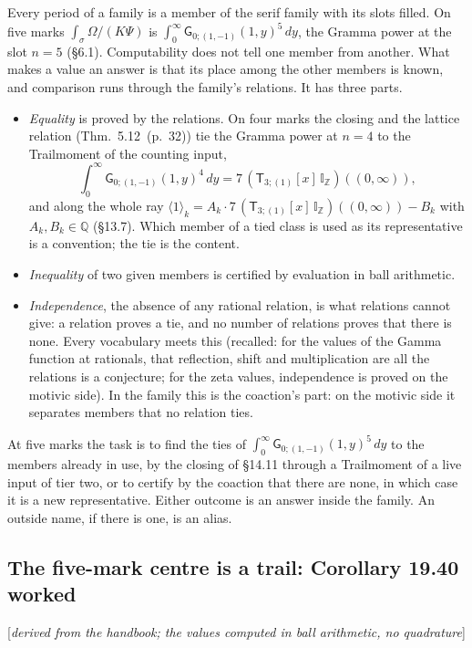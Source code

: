 \documentclass[11pt]{article}
\newcommand{\sG}{\mathsf G}
\newcommand{\sT}{\mathsf T}
\newcommand{\IZ}{\mathbb I_{\mathbb Z}}
\newcommand{\Tx}[3]{(\sT_{#1;(1)}[x]\,#2)((#3,\infty))}
\newcommand{\status}[1]{\hfill{\small[\textit{#1}]}}
\newcommand{\hb}[2]{#1~(p.~#2)}   %
\theoremstyle{plain}
\theoremstyle{remark}
\begin{document}
Every period of a family is a member of the serif family with its slots filled. On five marks $\int_\sigma\Omega/(K\Psi)$ is $\int_0^\infty\sG_{0;(1,-1)}(1,y)^5\,dy$, the Gramma power at the slot $n=5$ (\S6.1). Computability does not tell one member from another. What makes a value an answer is that its place among the other members is known, and comparison runs through the family's relations. It has three parts.
\begin{itemize}
\item \emph{Equality} is proved by the relations. On four marks the closing and the lattice relation (Thm.~\hb{5.12}{32}) tie the Gramma power at $n=4$ to the Trailmoment of the counting input,
\[
\int_0^\infty\sG_{0;(1,-1)}(1,y)^4\,dy=7\,\Tx3\IZ0,
\]
and along the whole ray $\langle1\rangle_k=A_k\cdot7\,\Tx3\IZ0-B_k$ with $A_k,B_k\in\mathbb Q$ (\S13.7). Which member of a tied class is used as its representative is a convention; the tie is the content.
\item \emph{Inequality} of two given members is certified by evaluation in ball arithmetic.
\item \emph{Independence}, the absence of any rational relation, is what relations cannot give: a relation proves a tie, and no number of relations proves that there is none. Every vocabulary meets this (recalled: for the values of the Gamma function at rationals, that reflection, shift and multiplication are all the relations is a conjecture; for the zeta values, independence is proved on the motivic side). In the family this is the coaction's part: on the motivic side it separates members that no relation ties.
\end{itemize}
At five marks the task is to find the ties of $\int_0^\infty\sG_{0;(1,-1)}(1,y)^5\,dy$ to the members already in use, by the closing of \S14.11 through a Trailmoment of a live input of tier two, or to certify by the coaction that there are none, in which case it is a new representative. Either outcome is an answer inside the family. An outside name, if there is one, is an alias.

\subsection{The five-mark centre is a trail: Corollary 19.40 worked}\status{derived from the handbook; the values computed in ball arithmetic, no quadrature}
\end{document}
